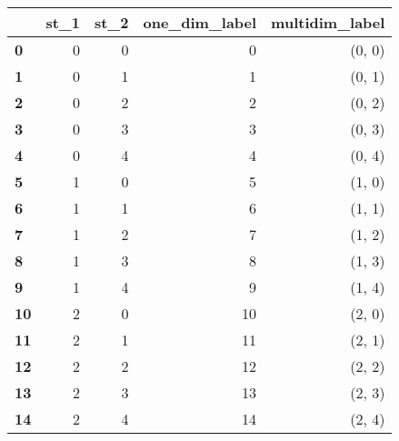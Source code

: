 \documentclass[10pt, article,table]{article}
\begin{document}
\begin{center}
\begin{scriptsize}
{
\begin{tabular}{lrrrr}
 \\
 \toprule{} 
 &  \textbf{st\_1} &  \textbf{st\_2} &  \textbf{one\_dim\_label} & \textbf{multidim\_label} 
 \\
 \midrule
 \textbf{0}  &     0 &     0 &  0 &         (0, 0) 
 \\
 \textbf{1}  &     0 &     1 &    1 &     (0, 1)
 \\
 \textbf{2}  &     0 &     2 &    2 &         (0, 2) 
 \\
 \textbf{3}  &     0 &     3 &    3 &         (0, 3) 
 \\
 \textbf{4}  &     0 &     4 &    4 &         (0, 4) 
 \\
 \textbf{5}  &     1 &     0 &    5 &         (1, 0)
 \\
 \textbf{6}  &     1 &     1 &    6 &         (1, 1) 
 \\ 
 \textbf{7}  &     1 &     2 &    7 &         (1, 2) 
 \\
 \textbf{8}  &     1 &     3 &    8 &         (1, 3)
 \\
 \textbf{9}  &     1 &     4 &    9 &         (1, 4) 
 \\
 \textbf{10} &     2 &     0 &   10 &         (2, 0) 
 \\
 \textbf{11} &     2 &     1 &   11 &         (2, 1) 
 \\
 \textbf{12} &     2 &     2 &   12 &         (2, 2) 
 \\
 \textbf{13} &     2 &     3 &   13 &         (2, 3) 
 \\
 \textbf{14} &     2 &     4 &   14 &         (2, 4) 
 \\
 \bottomrule
 \end{tabular}
 }
 \end{scriptsize}
 \end{center}
% 
        
\end{document}
